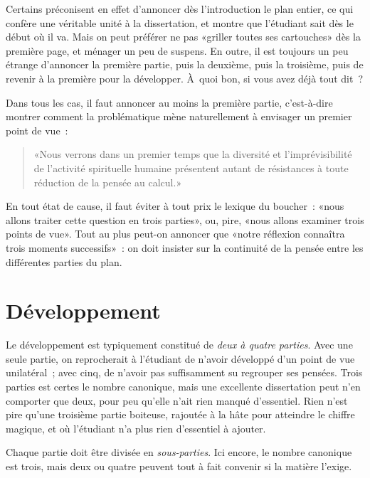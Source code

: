 \documentclass[a4paper,11pt]{article}
\newcommand{\cad}{c'est-à-dire}
\begin{document}
\par

Certains préconisent en effet d'annoncer dès l'introduction le plan
entier, ce qui confère une véritable unité à la dissertation, et montre
que l'étudiant sait dès le début où il va. Mais on peut préférer ne pas
«griller toutes ses cartouches» dès la première page, et ménager un peu
de suspens. En outre, il est toujours un peu étrange d'annoncer la
première partie, puis la deuxième, puis la troisième, puis de revenir à
la première pour la développer. À~quoi bon, si vous avez déjà tout dit~?

\par

Dans tous les cas, il faut annoncer au moins la première partie, \cad{}
montrer comment la problématique mène naturellement à envisager un
premier point de vue~:
\begin{quote}
  «Nous verrons dans un premier temps que la diversité et
  l'imprévisibilité de l'activité spirituelle humaine présentent autant
  de résistances à toute réduction de la pensée au calcul.»
\end{quote}

\par

En tout état de cause, il faut éviter à tout prix le lexique du
boucher~: «nous allons traiter cette question en trois parties», ou,
pire, «nous allons examiner trois points de vue». Tout au plus peut-on
annoncer que «notre réflexion connaîtra trois moments successifs»~: on
doit insister sur la continuité de la pensée entre les différentes
parties du plan.


\section{Développement}

Le développement est typiquement constitué de \emph{deux à quatre
  parties}. Avec une seule partie, on reprocherait à l'étudiant de
n'avoir développé d'un point de vue unilatéral~; avec cinq, de n'avoir
pas suffisamment su regrouper ses pensées. Trois parties est certes le
nombre canonique, mais une excellente dissertation peut n'en comporter
que deux, pour peu qu'elle n'ait rien manqué d'essentiel. Rien n'est
pire qu'une troisième partie boiteuse, rajoutée à la hâte pour atteindre
le chiffre magique, et où l'étudiant n'a plus rien d'essentiel à
ajouter.

Chaque partie doit être divisée en \emph{sous-parties}. Ici encore, le
nombre canonique est trois, mais deux ou quatre peuvent tout à fait
convenir si la matière l'exige.
\end{document}
